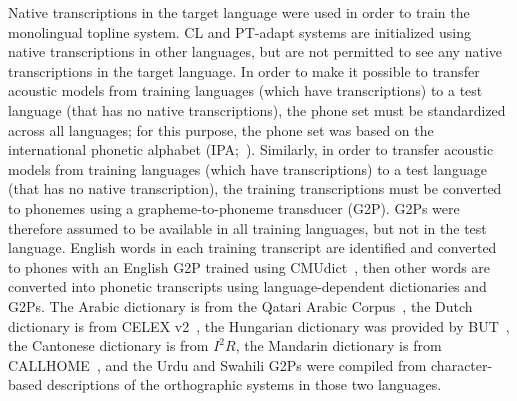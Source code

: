 

{\color{blue} Native transcriptions in the target language were used
  in order to train the {\sc monolingual} topline system.  {\sc CL}
  and {\sc PT-adapt} systems are initialized using native
  transcriptions in other languages, but are not permitted to see any
  native transcriptions in the target language.  In order to make it
  possible to transfer acoustic models from training languages (which
  have transcriptions) to a test language (that has no native
  transcriptions), the phone set must be standardized across all
  languages; for this purpose, the phone set was based on the
  international phonetic alphabet (IPA;~\cite{ipa1993}).  Similarly,
  in order to transfer acoustic models from training languages
  (which have transcriptions) to a test language (that has no
  native transcription), the training transcriptions must be
  converted to phonemes using a grapheme-to-phoneme transducer (G2P).
  G2Ps were therefore assumed to be available in all training languages,
  but not in the test language.}
  English words in each {\color{blue} training} transcript are identified and
converted to phones with an English G2P trained using
CMUdict~\cite{Lenzo1995}, then other words are converted into phonetic
transcripts using language-dependent dictionaries and G2Ps.
The Arabic dictionary is from the Qatari Arabic Corpus~\cite{Elmahdy14},
the Dutch dictionary is from CELEX v2~\cite{Baayen96},
the Hungarian dictionary was provided by BUT~\cite{Grezl14},
the Cantonese dictionary is from $I^2R$,
the Mandarin dictionary is from CALLHOME~\cite{LDC96},
and the Urdu and Swahili G2Ps were compiled from
character-based descriptions of the orthographic systems in those
two languages. 


